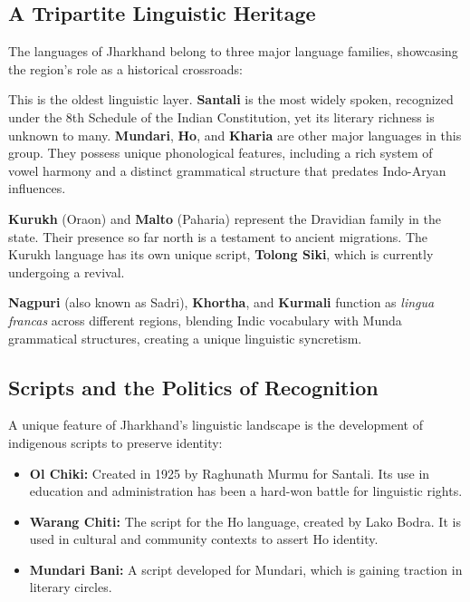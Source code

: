 \documentclass{article}
\begin{document}
\subsection{A Tripartite Linguistic Heritage}
The languages of Jharkhand belong to three major language families, showcasing the region's role as a historical crossroads:
\begin{description}[font=\color{jharkhandred}\bfseries]
    \item [Austroasiatic (Munda Languages):] This is the oldest linguistic layer. \textbf{Santali} is the most widely spoken, recognized under the 8th Schedule of the Indian Constitution, yet its literary richness is unknown to many. \textbf{Mundari}, \textbf{Ho}, and \textbf{Kharia} are other major languages in this group. They possess unique phonological features, including a rich system of vowel harmony and a distinct grammatical structure that predates Indo-Aryan influences.
    \item [Dravidian:] \textbf{Kurukh} (Oraon) and \textbf{Malto} (Paharia) represent the Dravidian family in the state. Their presence so far north is a testament to ancient migrations. The Kurukh language has its own unique script, \textbf{Tolong Siki}, which is currently undergoing a revival.
    \item [Indo-Aryan:] \textbf{Nagpuri} (also known as Sadri), \textbf{Khortha}, and \textbf{Kurmali} function as \textit{lingua francas} across different regions, blending Indic vocabulary with Munda grammatical structures, creating a unique linguistic syncretism.
\end{description}

\subsection{Scripts and the Politics of Recognition}
A unique feature of Jharkhand's linguistic landscape is the development of indigenous scripts to preserve identity:
\begin{itemize}
    \item \textbf{Ol Chiki:} Created in 1925 by Raghunath Murmu for Santali. Its use in education and administration has been a hard-won battle for linguistic rights.
    \item \textbf{Warang Chiti:} The script for the Ho language, created by Lako Bodra. It is used in cultural and community contexts to assert Ho identity.
    \item \textbf{Mundari Bani:} A script developed for Mundari, which is gaining traction in literary circles.
\end{itemize}
\end{document}
